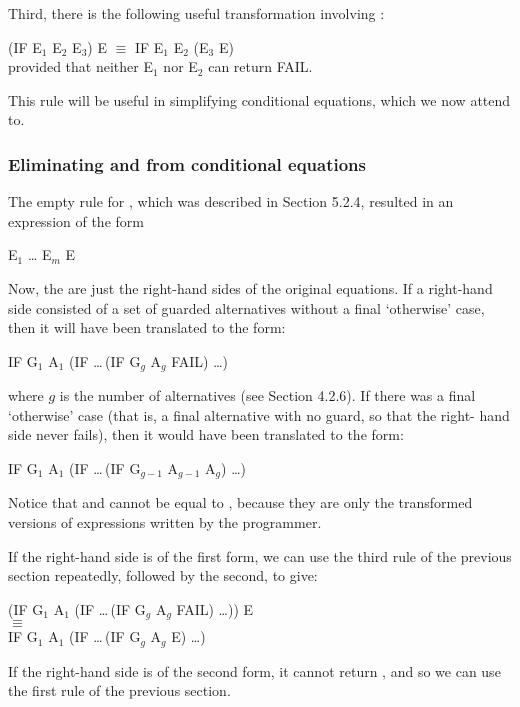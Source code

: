 Third, there is the following useful transformation involving :
\begin{mlcoded}
(IF E$_1$ E$_2$ E$_3$) \fatbar{} E $\equiv$ IF E$_1$ E$_2$ (E$_3$ \fatbar{} E)\\
{\normalfont provided that neither} E$_1$ {\normalfont nor} E$_2$ {\normalfont can return} FAIL.
\end{mlcoded}
This rule will be useful in simplifying conditional equations, which we now
attend to.

\subsubsection{Eliminating \ml{\fatbar{}} and  from conditional equations}

The empty rule for , which was described in Section 5.2.4, resulted in an
expression of the form
\begin{mlcoded}
E$_1$ \fatbar{} \ldots{} \fatbar{} E$_m$ \fatbar{} E
\end{mlcoded}

Now, the  are just the right-hand sides of the original equations. If a
right-hand side consisted of a set of guarded alternatives without a final
`otherwise' case, then it will have been translated to the form:
\begin{mlcoded}
IF G$_1$ A$_1$ (IF \ldots{}\,(IF G$_g$ A$_g$ FAIL) \ldots )
\end{mlcoded}
where $g$ is the number of alternatives (see Section 4.2.6). If there was a final
`otherwise' case (that is, a final alternative with no guard, so that the right-
hand side never fails), then it would have been translated to the form:
\begin{mlcoded}
	IF G$_1$ A$_1$ (IF \ldots{}\,(IF G$_{g-1}$ A$_{g-1}$ A$_{g}$) \ldots )
\end{mlcoded}
Notice that  and  cannot be equal to , because they are only the
transformed versions of expressions written by the programmer.

If the right-hand side is of the first form, we can use the third rule of the
previous section repeatedly, followed by the second, to give:
\begin{mlcoded}
(IF G$_1$ A$_1$ (IF \ldots{}\,(IF G$_g$ A$_g$ FAIL) \ldots )) \fatbar{} E\\
\phantom{.}\qquad \qquad \qquad \qquad $\equiv$\\
IF G$_1$ A$_1$ (IF \ldots{}\,(IF G$_g$ A$_g$ E) \ldots )
\end{mlcoded}
If the right-hand side is of the second form, it cannot return , and so we
can use the first rule of the previous section.

